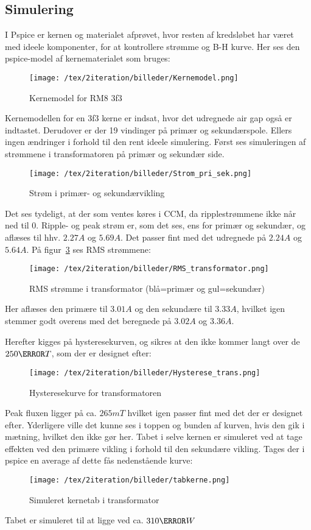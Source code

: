 \subsection{Simulering}
I Pspice er kernen og materialet afprøvet, hvor resten af kredsløbet har været med ideele komponenter, for at kontrollere strømme og B-H kurve. Her ses den pspice-model af kernematerialet som bruges:
\begin{figure}[H]
	\center
	\texttt{[image: /tex/2iteration/billeder/Kernemodel.png]}
	\caption{Kernemodel for RM8 3f3}
	\label{fig: Kernemodel}
\end{figure}
Kernemodellen for en 3f3 kerne er indsat, hvor det udregnede air gap også er indtastet. Derudover er der 19 vindinger på primær og sekundærspole. Ellers ingen ændringer i forhold til den rent ideele simulering. Først ses simuleringen af strømmene i transformatoren på primær og sekundær side.
\begin{figure}[H]
	\center
	\texttt{[image: /tex/2iteration/billeder/Strom\_pri\_sek.png]}
	\caption{Strøm i primær- og sekundærvikling}
	\label{fig: prisek_strom}
\end{figure}
Det ses tydeligt, at der som ventes køres i CCM, da ripplestrømmene ikke når ned til 0. Ripple- og peak strøm er, som det ses, ens for primær og sekundær, og aflæses til hhv. $2.27A$ og $5.69A$. Det passer fint med det udregnede på $2.24A$ og $5.64A$.
På figur~\ref{fig: RMS_trans} ses RMS strømmene:
\begin{figure}[H]
	\center
	\texttt{[image: /tex/2iteration/billeder/RMS\_transformator.png]}
	\caption{RMS strømme i transformator (blå=primær og gul=sekundær)}
	\label{fig: RMS_trans}
\end{figure}
Her aflæses den primære til $3.01A$ og den sekundære til $3.33A$, hvilket igen stemmer godt overens med det beregnede på $3.02A$ og $3.36A$.


\noindent Herefter kigges på hysteresekurven, og sikres at den ikke kommer langt over de $250\milli T$, som der er designet efter:
\begin{figure}[H]
	\center
	\texttt{[image: /tex/2iteration/billeder/Hysterese\_trans.png]}
	\caption{Hysteresekurve for transformatoren}
	\label{fig: Hysterese_trans}
\end{figure}
Peak fluxen ligger på ca. $265mT$ hvilket igen passer fint med det der er designet efter. Yderligere ville det kunne ses i toppen og bunden af kurven, hvis den gik i mætning, hvilket den ikke gør her.
Tabet i selve kernen er simuleret ved at tage effekten ved den primære vikling i forhold til den sekundære vikling. Tages der i pspice en average af dette fås nedenstående kurve:
\begin{figure}[H]
	\center
	\texttt{[image: /tex/2iteration/billeder/tabkerne.png]}
	\caption{Simuleret kernetab i transformator}
	\label{fig: Kernetab}
\end{figure}
Tabet er simuleret til at ligge ved ca. $310\milli W$

